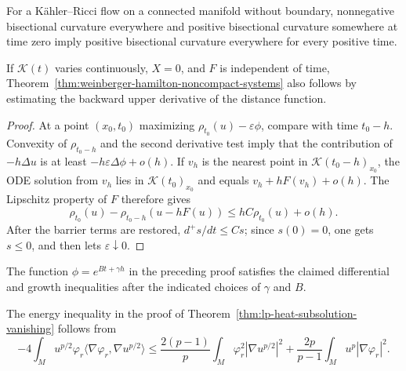\begin{remark}
\label{rem:kahler-ricci-positive-bisectional-curvature}


For a K\"ahler--Ricci flow on a connected manifold without boundary,
nonnegative bisectional curvature everywhere and positive bisectional
curvature somewhere at time zero imply positive bisectional curvature
everywhere for every positive time.
\end{remark}

\begin{example}
\label{ex:backward-time-convex-set-maximum-principle}
If $\mathcal K(t)$ varies continuously, $X=0$, and $F$ is independent of time,
Theorem~\ref{thm:weinberger-hamilton-noncompact-systems} also follows by
estimating the backward upper derivative of the distance function.
\end{example}
\begin{proof}
At a point $(x_0,t_0)$ maximizing
$\rho_{t_0}(u)-\varepsilon\phi$, compare with time $t_0-h$.  Convexity of
$\rho_{t_0-h}$ and the second derivative test imply that the contribution of
$-h\Delta u$ is at least $-h\varepsilon\Delta\phi+o(h)$.  If $v_h$ is the
nearest point in $\mathcal K(t_0-h)_{x_0}$, the ODE solution from $v_h$ lies
in $\mathcal K(t_0)_{x_0}$ and equals $v_h+hF(v_h)+o(h)$.  The Lipschitz
property of $F$ therefore gives
\[
\rho_{t_0}(u)-\rho_{t_0-h}(u-hF(u))
\leq hC\rho_{t_0}(u)+o(h).
\]
After the barrier terms are restored, $d^+s/dt\leq Cs$; since $s(0)=0$, one
gets $s\leq0$, and then lets $\varepsilon\downarrow0$.
\end{proof}

\begin{example}
\label{ex:construct-general-metric-barrier}
The function $\phi=e^{Bt+\gamma h}$ in the preceding proof satisfies the
claimed differential and growth inequalities after the indicated choices of
$\gamma$ and $B$.
\end{example}

\begin{example}
\label{ex:derive-lp-heat-energy-inequality}
The energy inequality in the proof of
Theorem~\ref{thm:lp-heat-subsolution-vanishing} follows from
\[
-4\int_Mu^{p/2}\varphi_r\langle\nabla\varphi_r,
\nabla u^{p/2}\rangle
\leq\frac{2(p-1)}p\int_M\varphi_r^2|\nabla u^{p/2}|^2
+\frac{2p}{p-1}\int_Mu^p|\nabla\varphi_r|^2.
\]
\end{example}
